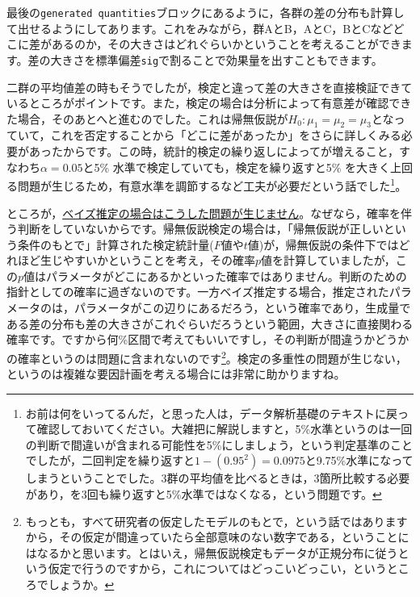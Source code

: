 \documentclass{ltjsbook}
\begin{document}
最後の\verb|generated quantities|ブロックにあるように，各群の差の分布も計算して出せるようにしてあります。これをみながら，群AとB，AとC，BとCなどどこに差があるのか，その大きさはどれぐらいかということを考えることができます。差の大きさを標準偏差\verb|sig|で割ることで効果量を出すこともできます。

二群の平均値差の時もそうでしたが，検定と違って差の大きさを直接検証できているところがポイントです。また，検定の場合は分析によって有意差が確認できた場合，そのあとへと進むのでした。これは帰無仮説が$H_0:\mu_1 = \mu_2 = \mu_3$となっていて，これを否定することから「どこに差があったか」をさらに詳しくみる必要があったからです。この時，統計的検定の繰り返しによってが増えること，すなわち$\alpha = 0.05$と5\% 水準で検定していても，検定を繰り返すと5\% を大きく上回る問題が生じるため，有意水準を調節するなど工夫が必要だという話でした\footnote{お前は何をいってるんだ，と思った人は，データ解析基礎のテキストに戻って確認しておいてください。大雑把に解説しますと，5\%水準というのは一回の判断で間違いが含まれる可能性を5\%にしましょう，という判定基準のことでしたが，二回判定を繰り返すと$1-(0.95^2)=0.0975$と9.75\%水準になってしまうということでした。3群の平均値を比べるときは，3箇所比較する必要があり，を3回も繰り返すと5\%水準ではなくなる，という問題です。}。

ところが，\underline{ベイズ推定の場合はこうした問題が生じません}。なぜなら，確率を伴う判断をしていないからです。帰無仮説検定の場合は，「帰無仮説が正しいという条件のもとで」計算された検定統計量($F$値や$t$値)が，帰無仮説の条件下ではどれほど生じやすいかということを考え，その確率$p$値を計算していましたが，この$p$値はパラメータがどこにあるかといった確率ではありません。判断のための指針としての確率に過ぎないのです。一方ベイズ推定する場合，推定されたパラメータのは，パラメータがこの辺りにあるだろう，という確率であり，生成量である差の分布も差の大きさがこれぐらいだろうという範囲，大きさに直接関わる確率です。ですから何\%区間で考えてもいいですし，その判断が間違うかどうかの確率というのは問題に含まれないのです\footnote{もっとも，すべて研究者の仮定したモデルのもとで，という話ではありますから，その仮定が間違っていたら全部意味のない数字である，ということにはなるかと思います。とはいえ，帰無仮説検定もデータが正規分布に従うという仮定で行うのですから，これについてはどっこいどっこい，というところでしょうか。}。検定の多重性の問題が生じない，というのは複雑な要因計画を考える場合には非常に助かりますね。
\end{document}
